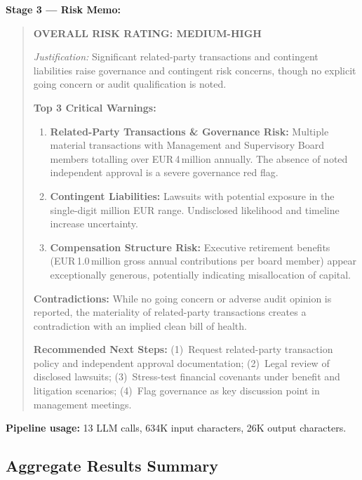 \documentclass[12pt,a4paper]{article}
\begin{document}
\textbf{Stage 3 --- Risk Memo:}

\begin{quote}
\small
\textbf{OVERALL RISK RATING: MEDIUM-HIGH}

\textit{Justification:} Significant related-party transactions and
contingent liabilities raise governance and contingent risk concerns,
though no explicit going concern or audit qualification is noted.

\textbf{Top 3 Critical Warnings:}

\begin{enumerate}
  \item \textbf{Related-Party Transactions \& Governance Risk:}
    Multiple material transactions with Management and Supervisory Board
    members totalling over EUR\,4\,million annually. The absence of noted
    independent approval is a severe governance red flag.

  \item \textbf{Contingent Liabilities:}
    Lawsuits with potential exposure in the single-digit million EUR range.
    Undisclosed likelihood and timeline increase uncertainty.

  \item \textbf{Compensation Structure Risk:}
    Executive retirement benefits (EUR\,1.0\,million gross annual
    contributions per board member) appear exceptionally generous,
    potentially indicating misallocation of capital.
\end{enumerate}

\textbf{Contradictions:} While no going concern or adverse audit opinion
is reported, the materiality of related-party transactions creates a
contradiction with an implied clean bill of health.

\textbf{Recommended Next Steps:}
(1)~Request related-party transaction policy and independent approval
documentation; (2)~Legal review of disclosed lawsuits;
(3)~Stress-test financial covenants under benefit and litigation scenarios;
(4)~Flag governance as key discussion point in management meetings.
\end{quote}

\textbf{Pipeline usage:} 13 LLM calls, 634K input characters,
26K output characters.

\subsection{Aggregate Results Summary}
\end{document}
